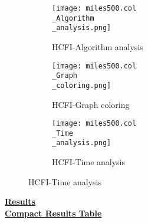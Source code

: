 \documentclass[10pt]{article}
\begin{document}
\graphicspath{{./Core1/Solutions/HCFI/miles500.col}}
\begin{figure}[H]
\begin{subfigure}{.33\textwidth}
  \centering
  \texttt{[image: miles500.col\\\_Algorithm\\\_analysis.png]}
  \caption{HCFI-Algorithm analysis}
   \label{fig:subfig1}
\end{subfigure}%
\begin{subfigure}{.33\textwidth}
  \centering
  \texttt{[image: miles500.col\\\_Graph\\\_coloring.png]}
  \caption{HCFI-Graph coloring}
  \label{fig:subfig2}
\end{subfigure}
\begin{subfigure}{.33\textwidth}
  \centering
  \texttt{[image: miles500.col\\\_Time\\\_analysis.png]}
  \caption{HCFI-Time analysis}
  \end{subfigure}
\end{figure}
\vspace{2cm}
\begin{center}
\hyperlink{page.8}{\textbf{Results}}\\
\vspace{0.5cm}
\hyperlink{page.71}{\textbf{Compact Results Table}}
\end{center}
\pagebreak
\end{document}
